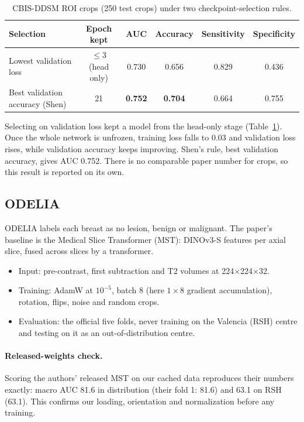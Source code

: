 \documentclass[11pt]{article}
\begin{document}
\begin{table}[htbp]
  \centering
  \caption{CBIS-DDSM ROI crops (250 test crops) under two checkpoint-selection rules.}
  \label{tab:cbis}
  \begin{tabular}{@{}l c c c c c@{}}
    \toprule
    Selection & Epoch kept & AUC & Accuracy & Sensitivity & Specificity \\
    \midrule
    Lowest validation loss & $\le$3 (head only) & 0.730 & 0.656 & 0.829 & 0.436 \\
    Best validation accuracy (Shen) & 21 & \textbf{0.752} & \textbf{0.704} & 0.664 & 0.755 \\
    \bottomrule
  \end{tabular}
\end{table}

Selecting on validation loss kept a model from the head-only stage
(Table~\ref{tab:cbis}). Once the whole network is unfrozen, training loss
falls to 0.03 and validation loss rises, while validation accuracy keeps
improving. Shen's rule, best validation accuracy, gives AUC 0.752. There is
no comparable paper number for crops, so this result is reported on its own.

\subsection{ODELIA}

ODELIA labels each breast as no lesion, benign or malignant. The paper's
baseline is the Medical Slice Transformer (MST): DINOv3-S features per axial
slice, fused across slices by a transformer.
\begin{itemize}
  \item Input: pre-contrast, first subtraction and T2 volumes at
    224$\times$224$\times$32.
  \item Training: AdamW at $10^{-5}$, batch 8 (here $1\times8$ gradient
    accumulation), rotation, flips, noise and random crops.
  \item Evaluation: the official five folds, never training on the Valencia
    (RSH) centre and testing on it as an out-of-distribution centre.
\end{itemize}

\paragraph{Released-weights check.} Scoring the authors' released MST on our
cached data reproduces their numbers exactly: macro AUC 81.6 in distribution
(their fold 1: 81.6) and 63.1 on RSH (63.1). This confirms our loading,
orientation and normalization before any training.
\end{document}
